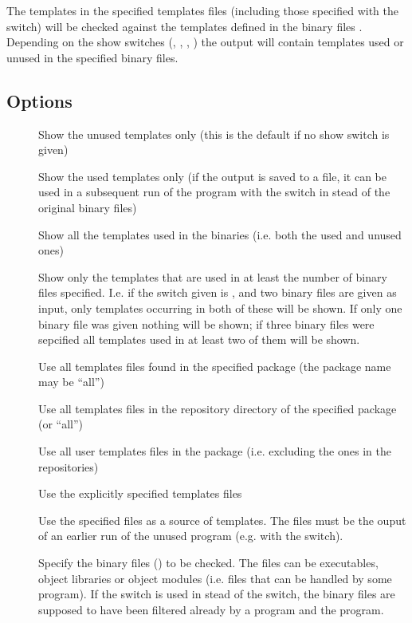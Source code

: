 The templates in the specified templates files (including those specified
with the  switch) will be checked against the
templates defined in the binary files . Depending on the show switches (, ,
, ) the output will contain templates used or unused in
the specified binary files.

\subsection*{Options}

\begin{description}
\item[]
   Show the unused templates only (this is the default if no show switch is
   given)
\item[]
   Show the used templates only (if the output is saved to a file, it can be
   used in a subsequent run of the  program with the 
   switch in stead of the original binary files)
\item[]
   Show all the templates used in the binaries (i.e. both the used and unused
   ones)
\item[]
   Show only the templates that are used in at least the number of binary
   files specified. I.e. if the switch given is , and two binary
   files are given as input, only templates occurring in both of these will
   be shown. If only one binary file was given nothing will be shown; if
   three binary files were sepcified all templates used in at least two of
   them will be shown.
\item[]
   Use all templates files found in the specified package (the package name
   may be ``all'')
\item[]
   Use all templates files in the repository directory of the specified
   package (or ``all'')
\item[]
   Use all user templates files in the package (i.e. excluding the ones in
   the repositories)
\item[]
   Use the explicitly specified templates files
\item[]
   Use the specified files as a source of templates. The files must be the
   ouput of an earlier run of the unused program (e.g. with the 
   switch).
\item[]
   Specify the binary files () to be checked. The files can be
   executables, object libraries or object modules (i.e. files that can be
   handled by some  program). If the  switch is used in stead
   of the  switch, the binary files are supposed to have been
   filtered already by a  program and the  program.
\end{description}

